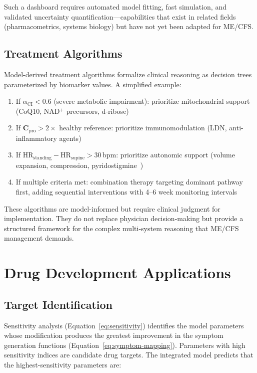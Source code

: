 Such a dashboard requires automated model fitting, fast simulation, and validated uncertainty quantification---capabilities that exist in related fields (pharmacometrics, systems biology) but have not yet been adapted for ME/CFS.

\subsection{Treatment Algorithms}

Model-derived treatment algorithms formalize clinical reasoning as decision trees parameterized by biomarker values. A simplified example:

\begin{enumerate}
    \item If $\alpha_{\text{CI}} < 0.6$ (severe metabolic impairment): prioritize mitochondrial support (CoQ10, NAD$^+$ precursors, d-ribose)
    \item If $\boldsymbol{C}_{\text{pro}} > 2\times$ healthy reference: prioritize immunomodulation (LDN, anti-inflammatory agents)
    \item If HR$_{\text{standing}} - \text{HR}_{\text{supine}} > 30$\,bpm: prioritize autonomic support (volume expansion, compression, pyridostigmine~\cite{Raj2005Pyridostigmine})
    \item If multiple criteria met: combination therapy targeting dominant pathway first, adding sequential interventions with 4--6 week monitoring intervals
\end{enumerate}

These algorithms are model-informed but require clinical judgment for implementation. They do not replace physician decision-making but provide a structured framework for the complex multi-system reasoning that ME/CFS management demands.

\section{Drug Development Applications}
\label{sec:drug-development}

\subsection{Target Identification}

Sensitivity analysis (Equation~\ref{eq:sensitivity}) identifies the model parameters whose modification produces the greatest improvement in the symptom generation functions (Equation~\ref{eq:symptom-mapping}). Parameters with high sensitivity indices are candidate drug targets. The integrated model predicts that the highest-sensitivity parameters are:

